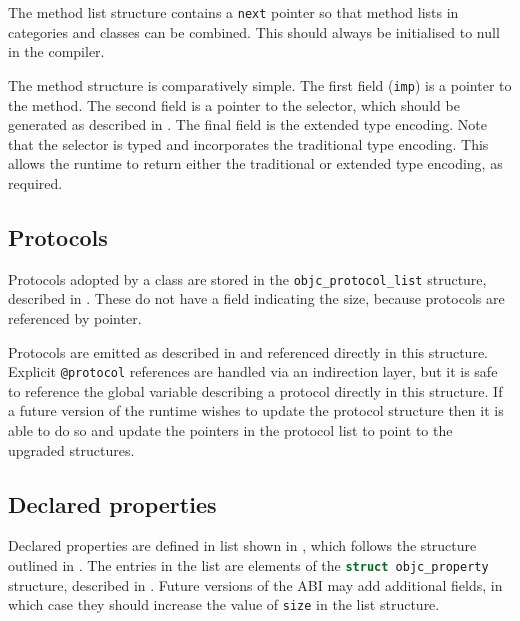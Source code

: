 \documentclass[a4paper]{report}
\newcommand{\ccode}[1]{\lstinline[language={C}]{#1}}
\newcommand{\objc}[1]{\lstinline[language={[Objective]C}]{#1}}
\newcommand{\inccode}[4]{
{
	 }}
	]{../#1}
}
}
\begin{document}
The method list structure contains a \ccode{next} pointer so that method lists in categories and classes can be combined.
This should always be initialised to null in the compiler.

\inccode{method.h}{methodlist}{objc_method_list}{The method structure.}
\inccode{method.h}{method}{objc_method}{The method structure.}

The method structure is comparatively simple.
The first field (\ccode{imp}) is a pointer to the method.
The second field is a pointer to the selector, which should be generated as described in .
The final field is the extended type encoding.
Note that the selector is typed and incorporates the traditional type encoding.
This allows the runtime to return either the traditional or extended type encoding, as required.

\subsection{Protocols}

Protocols adopted by a class are stored in the \ccode{objc_protocol_list} structure, described in .
These do not have a field indicating the size, because protocols are referenced by pointer.

\inccode{protocol.h}{protocollist}{objc_protocol_list}{The protocol structure.}

Protocols are emitted as described in  and referenced directly in this structure.
Explicit \objc{@protocol} references are handled via an indirection layer, but it is safe to reference the global variable describing a protocol directly in this structure.
If a future version of the runtime wishes to update the protocol structure then it is able to do so and update the pointers in the protocol list to point to the upgraded structures.

\subsection{Declared properties}


Declared properties are defined in list shown in , which follows the structure outlined in .
The entries in the list are elements of the \ccode{struct objc_property} structure, described in .
Future versions of the ABI may add additional fields, in which case they should increase the value of \ccode{size} in the list structure.
\end{document}
